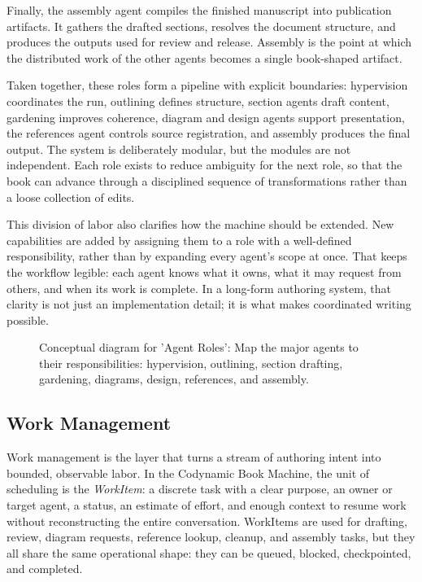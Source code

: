 \documentclass[11pt]{article}
\begin{document}
Finally, the assembly agent compiles the finished manuscript into publication artifacts. It gathers the drafted sections, resolves the document structure, and produces the outputs used for review and release. Assembly is the point at which the distributed work of the other agents becomes a single book-shaped artifact.

Taken together, these roles form a pipeline with explicit boundaries: hypervision coordinates the run, outlining defines structure, section agents draft content, gardening improves coherence, diagram and design agents support presentation, the references agent controls source registration, and assembly produces the final output. The system is deliberately modular, but the modules are not independent. Each role exists to reduce ambiguity for the next role, so that the book can advance through a disciplined sequence of transformations rather than a loose collection of edits.

This division of labor also clarifies how the machine should be extended. New capabilities are added by assigning them to a role with a well-defined responsibility, rather than by expanding every agent's scope at once. That keeps the workflow legible: each agent knows what it owns, what it may request from others, and when its work is complete. In a long-form authoring system, that clarity is not just an implementation detail; it is what makes coordinated writing possible.

\begin{figure}[htbp]
\centering

\caption{Conceptual diagram for 'Agent Roles': Map the major agents to their responsibilities: hypervision, outlining, section drafting, gardening, diagrams, design, references, and assembly.}
\end{figure}



\subsection{Work Management}


Work management is the layer that turns a stream of authoring intent into bounded, observable labor. In the Codynamic Book Machine, the unit of scheduling is the \emph{WorkItem}: a discrete task with a clear purpose, an owner or target agent, a status, an estimate of effort, and enough context to resume work without reconstructing the entire conversation. WorkItems are used for drafting, review, diagram requests, reference lookup, cleanup, and assembly tasks, but they all share the same operational shape: they can be queued, blocked, checkpointed, and completed.
\end{document}
